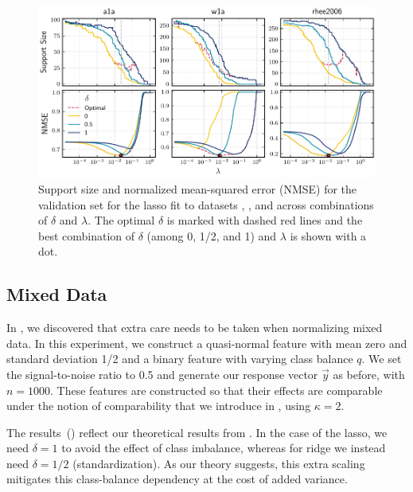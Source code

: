 \begin{figure}[htpb]
  \centering
  \includegraphics[]{plots/hyperopt_paths.pdf}
  \caption{%
    Support size and normalized mean-squared error (NMSE) for the validation set for the lasso fit to datasets , , and  across combinations of \(\delta\) and \(\lambda\). The optimal \(\delta\) is marked with dashed red lines and the best combination of \(\delta\) (among 0, 1/2, and 1) and \(\lambda\) is shown with a dot.
  }
  \label{fig:hyperopt-support}
\end{figure}

\subsection{Mixed Data}\label{sec:experiments-mixed-data}

In , we discovered that extra care needs to be taken when normalizing mixed data. In this experiment, we construct a quasi-normal feature with mean zero and standard deviation 1/2 and a binary feature with varying class balance \(q\). We set the signal-to-noise ratio to 0.5 and generate our response vector \(\vec{y}\) as before, with \(n = \num{1000}\). These features are constructed so that their effects are comparable under the notion of comparability that we introduce in , using \(\kappa = 2\).

The results~() reflect our theoretical results from . In the case of the lasso, we need \(\delta =1\) to avoid the effect of class imbalance, whereas for ridge we instead need \(\delta =1/2\) (standardization). As our theory suggests, this extra scaling mitigates this class-balance dependency at the cost of added variance.

